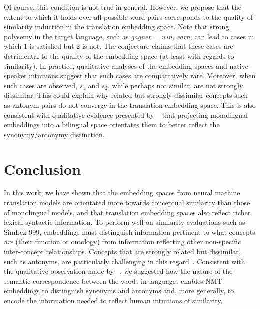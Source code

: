 
Of course, this condition is not true in general. However, we propose that the extent to which it holds over all possible word pairs corresponds to the quality of similarity induction in the translation embedding space. Note that strong polysemy in the target language, such as \emph{gagner = win, earn}, can lead to cases in which \(1\) is satisfied but \(2\) is not. The conjecture claims that these cases are detrimental to the quality of the embedding space (at least with regards to similarity). In practice, qualitative analyses of the embedding spaces and native speaker intuitions suggest that such cases are comparatively rare. Moreover, when such cases are observed, \(s_1\) and \(s_2\), while perhaps not similar, are not strongly dissimilar. This could explain why related but strongly dissimilar concepts such as antonym pairs do not converge in the translation embedding space. This is also consistent with qualitative evidence presented by ~\cite{faruqui2014improving} that projecting monolingual embeddings into a bilingual space orientates them to better reflect the synonymy/antonymy distinction.
    

\section{Conclusion}

In this work, we have shown that the embedding spaces from neural machine translation models are orientated more towards conceptual similarity than those of monolingual models, and that translation embedding spaces also reflect richer lexical syntactic information. To perform well on similarity evaluations such as SimLex-999, embeddings must distinguish information pertinent to what concepts \emph{are} (their function or ontology) from information reflecting other non-specific inter-concept relationships. Concepts that are strongly related but dissimilar, such as antonyms, are particularly challenging in this regard~\cite{hill2014simlex}. Consistent with the qualitative observation made by ~\cite{faruqui2014improving}, we suggested how the nature of the semantic correspondence between the words in languages enables NMT embeddings to distinguish synonyms and antonyms and, more generally, to encode the information needed to reflect human intuitions of similarity.   

